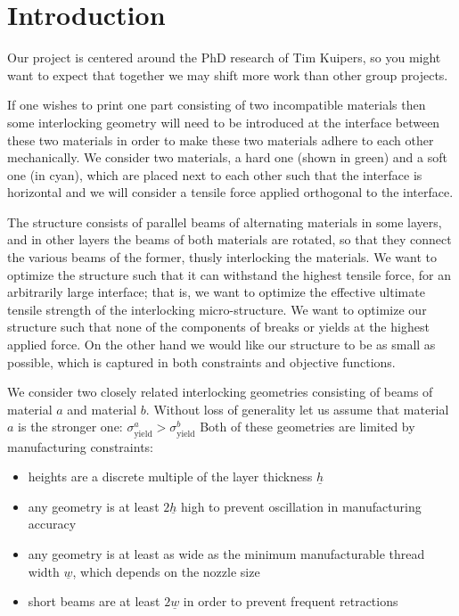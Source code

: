 \section{Introduction}
Our project is centered around the PhD research of Tim Kuipers, so you might want to expect that together we may shift more work than other group projects.

\medskip

If one wishes to print one part consisting of two incompatible materials then some interlocking geometry will need to be introduced at the interface between these two materials in order to make these two materials adhere to each other mechanically.
We consider two materials, a hard one (shown in green) and a soft one (in cyan), which are placed next to each other such that the interface is horizontal
and we will consider a tensile force applied orthogonal to the interface.

The structure consists of parallel beams of alternating materials in some layers, and in other layers the beams of both materials are rotated, so that they connect the various beams of the former, thusly interlocking the materials.
We want to optimize the structure such that it can withstand the highest tensile force, for an arbitrarily large interface;
that is, we want to optimize the effective ultimate tensile strength of the interlocking micro-structure.
We want to optimize our structure such that none of the components of breaks or yields at the highest applied force.
On the other hand we would like our structure to be as small as possible, which is captured in both constraints and objective functions.

\newcommand{\hmin}{\underline{h}}
\newcommand{\wmin}{\underline{w}}
\newcommand{\lmax}{\overline{L}}

We consider two closely related interlocking geometries consisting of beams of material $a$ and material $b$.
Without loss of generality let us assume that material $a$ is the stronger one: $\sigma^a_\text{yield} > \sigma^b_\text{yield} $
Both of these geometries are limited by manufacturing constraints:
\begin{itemize}
	\item heights are a discrete multiple of the layer thickness $\hmin$
	\item any geometry is at least $2\hmin$ high to prevent oscillation in manufacturing accuracy
	\item any geometry is at least as wide as the minimum manufacturable thread width $\wmin$, which depends on the nozzle size
	\item short beams are at least $2\wmin$ in order to prevent frequent retractions
\end{itemize}

